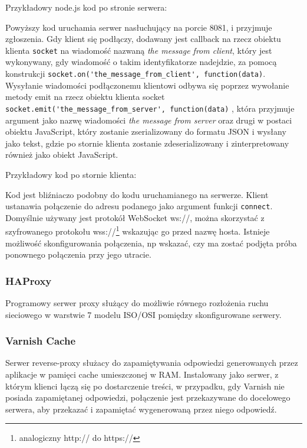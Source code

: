 Przykładowy node.js kod po stronie serwera:



Powyższy kod uruchamia serwer nasłuchujący na porcie 8081, i przyjmuje zgłoszenia. Gdy klient się podłączy, dodawany jest callback na rzecz obiektu klienta \lstinline{socket} na wiadomość nazwaną \emph{the message from client}, który jest wykonywany, gdy wiadomość o takim identyfikatorze nadejdzie, za pomocą konstrukcji \lstinline{socket.on('the_message_from_client', function(data)}. Wysyłanie wiadomości podłączonemu klientowi odbywa się poprzez wywołanie metody emit na rzecz obiektu klienta socket \lstinline{socket.emit('the_message_from_server', function(data)} , która przyjmuje argument jako nazwę wiadomości \emph{the message from server} oraz drugi w postaci obiektu JavaScript, który zostanie zserializowany do formatu JSON i wysłany jako tekst, gdzie po stornie klienta zostanie zdeserializowany i zinterpretowany również jako obiekt JavaScript.

Przykładowy kod po stornie klienta:



Kod jest bliźniaczo podobny do kodu uruchamianego na serwerze. Klient ustanawia połączenie do adresu podanego jako argument funkcji \lstinline{connect}. Domyślnie używany jest protokół WebSocket ws://, można skorzystać z szyfrowanego protokołu wss://\footnote{analogiczny http:// do https://} wskazując go przed nazwę hosta. Istnieje możliwość skonfigurowania połączenia, np wskazać, czy ma zostać podjęta próba ponownego połączenia przy jego utracie.

\subsubsection{HAProxy}

Programowy serwer proxy służący do możliwie równego rozłożenia ruchu sieciowego w warstwie 7 modelu ISO/OSI pomiędzy skonfigurowane serwery.

\subsubsection{Varnish Cache}

Serwer reverse-proxy służacy do zapamiętywania odpowiedzi generowanych przez aplikacje w pamięci cache umieszczonej w RAM. Instalowany jako serwer, z którym klienci łączą się po dostarczenie treści, w przypadku, gdy Varnish nie posiada zapamiętanej odpowiedzi, połączenie jest przekazywane do docelowego serwera, aby przekazać i zapamiętać wygenerowaną przez niego odpowiedź.

